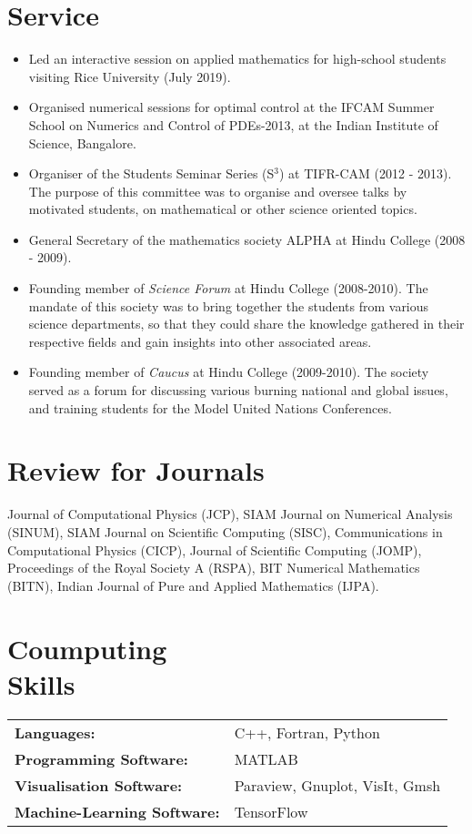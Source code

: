 \documentclass[margin]{res}
\begin{document}
\begin{resume}
\section{Service} 
               \begin{itemize} \itemsep -2pt
               \item Led an interactive session on applied mathematics for high-school students visiting Rice University (July 2019). 
                \item Organised numerical sessions for optimal control at the IFCAM Summer School on Numerics and Control of PDEs-2013, at the Indian Institute of Science, Bangalore.
               \item Organiser of the Students Seminar Series (S$^3$) at TIFR-CAM (2012 - 2013). The purpose of this committee was to organise and oversee talks by motivated students, on mathematical or other science oriented topics.   
               \item General Secretary of the mathematics society ALPHA at Hindu College (2008 - 2009). 
               \item Founding member of {\it Science Forum} at Hindu College (2008-2010). The mandate of this society was to bring together the students from various science departments, so that they could share the knowledge gathered in their respective fields and gain insights into other associated areas.
               \item Founding member of {\it Caucus} at Hindu College (2009-2010). The society served as a forum for discussing various burning national and global issues, and training students for the Model United Nations Conferences.
               \end{itemize}                    
               
\section{Review for Journals}  
              Journal of Computational Physics (JCP), SIAM Journal on Numerical Analysis (SINUM), SIAM Journal on Scientific Computing (SISC), Communications in Computational Physics (CICP), Journal of Scientific Computing (JOMP), Proceedings of the Royal Society A (RSPA), BIT Numerical Mathematics (BITN), Indian Journal of Pure and Applied Mathematics (IJPA).
               
               
\section{Coumputing \\ Skills}
   \begin{tabular}{l p{3in}}
    {\bf Languages:} & C++, Fortran, Python \\

    {\bf Programming Software:} &  MATLAB \\
    
    {\bf Visualisation Software:} & Paraview, Gnuplot, VisIt, Gmsh \\
    
    {\bf Machine-Learning Software:} & TensorFlow
 \end{tabular}


\end{resume} 
\end{document}
